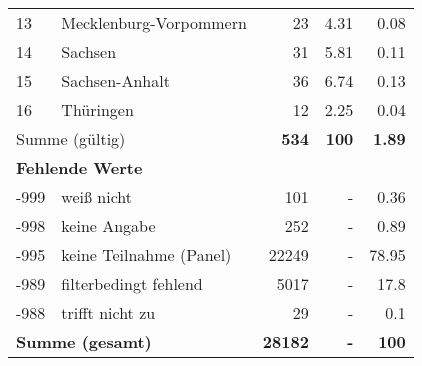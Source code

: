 \begin{longtable}{lXrrr}
     13 &
     \multicolumn{1}{X}{ Mecklenburg-Vorpommern   } &


       \num{23} &
       \num[round-mode=places,round-precision=2]{4,31} &
         \num[round-mode=places,round-precision=2]{0,08} \\

     14 &
     \multicolumn{1}{X}{ Sachsen   } &


       \num{31} &
       \num[round-mode=places,round-precision=2]{5,81} &
         \num[round-mode=places,round-precision=2]{0,11} \\

     15 &
     \multicolumn{1}{X}{ Sachsen-Anhalt   } &


       \num{36} &
       \num[round-mode=places,round-precision=2]{6,74} &
         \num[round-mode=places,round-precision=2]{0,13} \\

     16 &
     \multicolumn{1}{X}{ Thüringen   } &


       \num{12} &
       \num[round-mode=places,round-precision=2]{2,25} &
         \num[round-mode=places,round-precision=2]{0,04} \\
     \midrule
     \multicolumn{2}{l}{Summe (gültig)} &
       \textbf{\num{534}} &
     \textbf{100} &
       \textbf{\num[round-mode=places,round-precision=2]{1,89}} \\
     \multicolumn{5}{l}{\textbf{Fehlende Werte}}\\
       -999 &
       weiß nicht &
         \num{101} &
        - &
         \num[round-mode=places,round-precision=2]{0,36} \\
       -998 &
       keine Angabe &
         \num{252} &
        - &
         \num[round-mode=places,round-precision=2]{0,89} \\
       -995 &
       keine Teilnahme (Panel) &
         \num{22249} &
        - &
         \num[round-mode=places,round-precision=2]{78,95} \\
       -989 &
       filterbedingt fehlend &
         \num{5017} &
        - &
         \num[round-mode=places,round-precision=2]{17,8} \\
       -988 &
       trifft nicht zu &
         \num{29} &
        - &
         \num[round-mode=places,round-precision=2]{0,1} \\
     \midrule
     \multicolumn{2}{l}{\textbf{Summe (gesamt)}} &
          \textbf{\num{28182}} &
        \textbf{-} &
        \textbf{100} \\
     \bottomrule
     \end{longtable}
     
